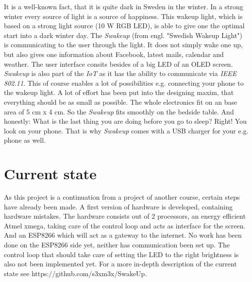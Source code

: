 It is a well-known fact, that it is quite dark in Sweden in the winter. In a strong winter every source of light is a source of happiness. This wakeup light, which is based on a strong light source (10 W RGB LED), is able to give one the optimal start into a dark winter day. The \textit{Swakeup} (from engl. "Swedish Wakeup Light") is communicating to the user through the light. It does not simply wake one up, but also gives one information about Facebook, latest mails, calendar and weather. The user interface consits besides of a big LED of an OLED screen. \textit{Swakeup} is also part of the \textit{IoT} as it has the ability to communicate via \textit{IEEE 802.11}. This of course enables a lot of possibilities e.g. connecting your phone to the wakeup light. A lot of effort has been put into the designing maxim, that everything should be as small as possible. The whole electronics fit on an base area of 5 cm x 4 cm. So the \textit{Swakeup} fits smoothly on the bedside table. And honestly: What is the last thing you are doing before you go to sleep? Right! You look on your phone. That is why \textit{Swakeup} comes with a USB charger for your e.g. phone as well.
\section{Current state}
As this project is a continuation from a project of another course, certain steps have already been made. A first version of hardware is developed, containing hardware mistakes. The hardware consists out of 2 processors, an energy efficient Atmel xmega, taking care of the control loop and acts as interface for the screen. And an ESP8266 which will act as a gateway to the internet. No work has been done on the ESP8266 side yet, neither has communication been set up. The control loop that should take care of setting the LED to the right brightness is also not been implemented yet. For a more in-depth description of the current state see https://github.com/s3xm3x/SwakeUp.
